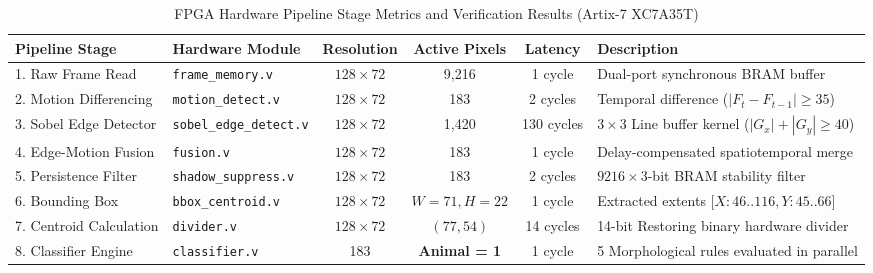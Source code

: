 \begin{table}[t]
\centering
\caption{FPGA Hardware Pipeline Stage Metrics and Verification Results (Artix-7 XC7A35T)}
\label{tab:fpga_pipeline_metrics}
\begin{tabular}{|l|l|c|c|c|l|}
\hline
\textbf{Pipeline Stage} & \textbf{Hardware Module} & \textbf{Resolution} & \textbf{Active Pixels} & \textbf{Latency} & \textbf{Description} \\ \hline
1. Raw Frame Read & \texttt{frame\_memory.v} & $128 \times 72$ & 9,216 & 1 cycle & Dual-port synchronous BRAM buffer \\ \hline
2. Motion Differencing & \texttt{motion\_detect.v} & $128 \times 72$ & 183 & 2 cycles & Temporal difference ($|F_t - F_{t-1}| \ge 35$) \\ \hline
3. Sobel Edge Detector & \texttt{sobel\_edge\_detect.v} & $128 \times 72$ & 1,420 & 130 cycles & $3 \times 3$ Line buffer kernel ($|G_x| + |G_y| \ge 40$) \\ \hline
4. Edge-Motion Fusion & \texttt{fusion.v} & $128 \times 72$ & 183 & 1 cycle & Delay-compensated spatiotemporal merge \\ \hline
5. Persistence Filter & \texttt{shadow\_suppress.v} & $128 \times 72$ & 183 & 2 cycles & $9216 \times 3$-bit BRAM stability filter \\ \hline
6. Bounding Box & \texttt{bbox\_centroid.v} & $128 \times 72$ & $W=71, H=22$ & 1 cycle & Extracted extents [$X: 46..116, Y: 45..66$] \\ \hline
7. Centroid Calculation & \texttt{divider.v} & $128 \times 72$ & $(77, 54)$ & 14 cycles & 14-bit Restoring binary hardware divider \\ \hline
8. Classifier Engine & \texttt{classifier.v} & 183 & \textbf{Animal = 1} & 1 cycle & 5 Morphological rules evaluated in parallel \\ \hline
\end{tabular}
\end{table}
